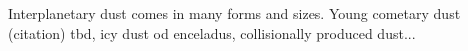Interplanetary dust comes in many forms and sizes. Young cometary dust (citation) tbd, icy dust od enceladus, collisionally produced dust...